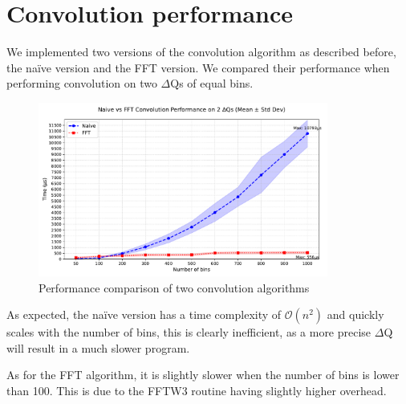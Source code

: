 \section{Convolution performance}
    We implemented two versions of the convolution algorithm as described before, the naïve version and the FFT version. We compared their performance when performing convolution on two $\Delta$Qs of equal bins.
    \begin{figure}[H]
        \begin{center}
            \includegraphics[width=0.85\textwidth]{img/conv_perf.pdf}
        \end{center}
        \caption{Performance comparison of two convolution algorithms}\label{fig:conv_perf}
    \end{figure}

    As expected, the naïve version has a time complexity of $\mathcal{O}(n^2)$ and quickly scales with the number of bins, this is clearly inefficient, as a more precise $\Delta$Q will result in a much slower program.


As for the FFT algorithm, it is slightly slower when the number of bins is lower than 100. This is due to the FFTW3 routine having slightly higher overhead.
